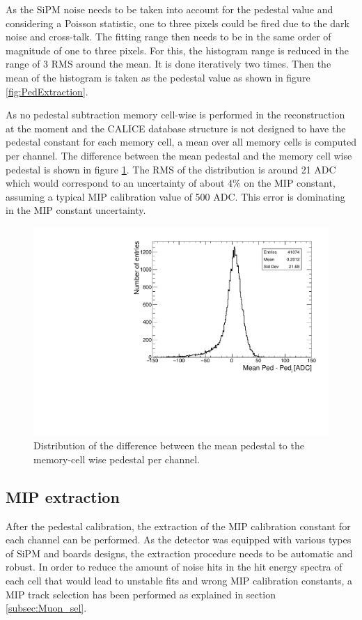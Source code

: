 As the SiPM noise needs to be taken into account for the pedestal value and considering a Poisson statistic, one to three pixels could be fired due to the dark noise and cross-talk. The fitting range then needs to be in the same order of magnitude of one to three pixels. For this, the histogram range is reduced in the range of 3 RMS around the mean. It is done iteratively two times. Then the mean of the histogram is taken as the pedestal value as shown in figure \ref{fig:PedExtraction}.

As no pedestal subtraction memory cell-wise is performed in the reconstruction at the moment and the CALICE database structure is not designed to have the pedestal constant for each memory cell, a mean over all memory cells is computed per channel. The difference between the mean pedestal and the memory cell wise pedestal is shown in figure \ref{fig:CompMeanMem}. The RMS of the distribution is around 21 ADC which would correspond to an uncertainty of about 4\% on the MIP constant, assuming a typical MIP calibration value of 500 ADC. This error is dominating in the MIP constant uncertainty.

\begin{figure}[htbp!]
	\centering
	\includegraphics[width=0.6\linewidth]{../Thesis_Plots/EnergyCalib/Plots/ComparisonMeanPedtoMemorycell.pdf}
	\caption{Distribution of the difference between the mean pedestal to the memory-cell wise pedestal per channel.} \label{fig:CompMeanMem}
\end{figure}

\subsection{MIP extraction}
\label{sec:MIPExtraction}

After the pedestal calibration, the extraction of the MIP calibration constant for each channel can be performed. As the detector was equipped with various types of SiPM and boards designs, the extraction procedure needs to be automatic and robust. In order to reduce the amount of noise hits in the hit energy spectra of each cell that would lead to unstable fits and wrong MIP calibration constants, a MIP track selection has been performed as explained in section \ref{subsec:Muon_sel}.

